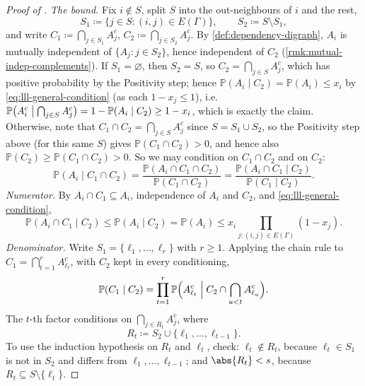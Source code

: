 \begin{proof}[Proof of {}]
    \emph{The bound.} Fix \(i \notin S\), split \(S\) into the out-neighbours of \(i\) and the rest,
    \[
        S_{1} \coloneqq \{ j \in S : (i,j) \in E(\Gamma) \}, \qquad S_{2} \coloneqq S \setminus S_{1},
    \]
    and write \(C_{1} \coloneqq \bigcap_{j \in S_{1}} A_{j}^{c}\), \(C_{2} \coloneqq \bigcap_{j \in S_{2}} A_{j}^{c}\). By \autoref{def:dependency-digraph}, \(A_{i}\) is mutually independent of \(\{ A_{j} : j \in S_{2} \}\), hence independent of \(C_{2}\) (\autoref{rmk:mutual-indep-complements}). If \(S_{1} = \varnothing\), then \(S_{2} = S\), so \(C_{2} = \bigcap_{j \in S} A_{j}^{c}\), which has positive probability by the Positivity step; hence \(\mathbb{P}(A_{i} \mid C_{2}) = \mathbb{P}(A_{i}) \le x_{i}\) by \eqref{eq:lll-general-condition} (as each \(1 - x_{j} \le 1\)), i.e.\ \(\mathbb{P}\bigl( A_{i}^{c} \bigm| \bigcap_{j \in S} A_{j}^{c} \bigr) = 1 - \mathbb{P}(A_{i} \mid C_{2}) \ge 1 - x_{i}\), which is exactly the claim. Otherwise, note that \(C_{1} \cap C_{2} = \bigcap_{j \in S} A_{j}^{c}\) since \(S = S_{1} \cup S_{2}\), so the Positivity step above (for this same \(S\)) gives \(\mathbb{P}(C_{1} \cap C_{2}) > 0\), and hence also \(\mathbb{P}(C_{2}) \ge \mathbb{P}(C_{1} \cap C_{2}) > 0\). So we may condition on \(C_{1} \cap C_{2}\) and on \(C_{2}\):
    \[
        \mathbb{P}(A_{i} \mid C_{1} \cap C_{2})
        = \frac{\mathbb{P}(A_{i} \cap C_{1} \cap C_{2})}{\mathbb{P}(C_{1} \cap C_{2})}
        = \frac{\mathbb{P}(A_{i} \cap C_{1} \mid C_{2})}{\mathbb{P}(C_{1} \mid C_{2})} .
    \]
    \emph{Numerator.} By \(A_{i} \cap C_{1} \subseteq A_{i}\), independence of \(A_{i}\) and \(C_{2}\), and \eqref{eq:lll-general-condition},
    \[
        \mathbb{P}(A_{i} \cap C_{1} \mid C_{2}) \le \mathbb{P}(A_{i} \mid C_{2}) = \mathbb{P}(A_{i}) \le x_{i} \prod_{j : (i,j) \in E(\Gamma)} (1 - x_{j}) .
    \]
    \emph{Denominator.} Write \(S_{1} = \{ \ell_{1}, \ldots, \ell_{r} \}\) with \(r \ge 1\). Applying the chain rule to \(C_{1} = \bigcap_{t=1}^{r} A_{\ell_{t}}^{c}\), with \(C_{2}\) kept in every conditioning,
    \[
        \mathbb{P}(C_{1} \mid C_{2})
        = \prod_{t=1}^{r} \mathbb{P}\Bigl( A_{\ell_{t}}^{c} \Bigm| C_{2} \cap \bigcap_{u < t} A_{\ell_{u}}^{c} \Bigr) .
    \]
    The \(t\)-th factor conditions on \(\bigcap_{j \in R_{t}} A_{j}^{c}\), where
    \[
        R_{t} \coloneqq S_{2} \cup \{ \ell_{1}, \ldots, \ell_{t-1} \} .
    \]
    To use the induction hypothesis on \(R_{t}\) and \(\ell_{t}\), check:
    \(\ell_{t} \notin R_{t}\), because \(\ell_{t} \in S_{1}\) is not in \(S_{2}\) and differs from \(\ell_{1}, \ldots, \ell_{t-1}\);
    and \(\abs{R_{t}} < s\), because \(R_{t} \subseteq S \setminus \{ \ell_{t} \}\).

\end{proof}

